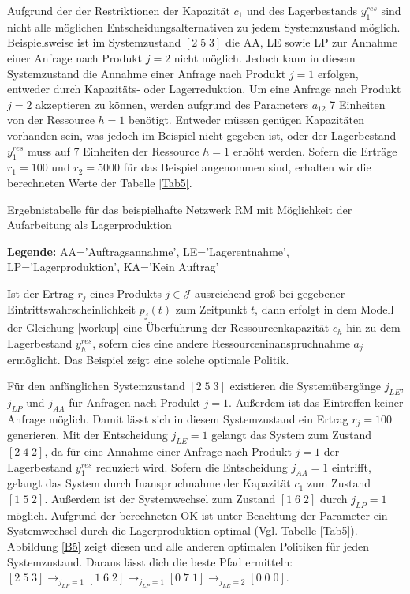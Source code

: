 Aufgrund der der Restriktionen der Kapazität $c_{1}$ und des Lagerbestands $y_{1}^{res}$ sind nicht alle möglichen Entscheidungsalternativen zu jedem Systemzustand möglich. Beispielsweise ist im Systemzustand $[2\;5\;3]$ die AA, LE sowie LP zur Annahme einer Anfrage nach Produkt $j=2$ nicht möglich. Jedoch kann in diesem Systemzustand die Annahme einer Anfrage nach Produkt $j=1$ erfolgen, entweder durch Kapazitäts- oder Lagerreduktion. Um eine Anfrage nach Produkt $j=2$ akzeptieren zu können, werden aufgrund des Parameters $a_{12}$ 7 Einheiten von der Ressource $h=1$ benötigt. Entweder müssen genügen Kapazitäten vorhanden sein, was jedoch im Beispiel nicht gegeben ist, oder der Lagerbestand $y_{1}^{res}$ muss auf 7 Einheiten der Ressource $h=1$ erhöht werden. Sofern die Erträge $r_{1}=100$ und $r_{2}=5000$ für das Beispiel angenommen sind, erhalten wir die berechneten Werte der Tabelle \ref{Tab5}.
\begin{table}
\begin{footnotesize}
    \caption{Ergebnistabelle für das beispielhafte Netzwerk RM mit Möglichkeit der Aufarbeitung als Lagerproduktion} \label{Tab5}
    \vspace*{3mm}
    \begin{center}
      {\footnotesize \textbf{Legende:} AA='Auftragsannahme', LE='Lagerentnahme', LP='Lagerproduktion', KA='Kein Auftrag'} 
      \end{center}
\end{footnotesize}
\end{table}

Ist der Ertrag $r_{j}$ eines Produkts $j\in\mathcal{J}$ ausreichend groß bei gegebener Eintrittswahrscheinlichkeit $p_{j}(t)$ zum Zeitpunkt $t$, dann erfolgt in dem Modell der Gleichung \eqref{workup} eine Überführung der Ressourcenkapazität $c_{h}$ hin zu dem Lagerbestand $y_{h}^{res}$, sofern dies eine andere Ressourceninanspruchnahme $a_{j}$ ermöglicht. Das Beispiel zeigt eine solche optimale Politik.

Für den anfänglichen Systemzustand $[2\;5\;3]$ existieren die Systemübergänge $j_{LE}$, $j_{LP}$ und $j_{AA}$ für Anfragen nach Produkt $j=1$. Außerdem ist das Eintreffen keiner Anfrage möglich. Damit lässt sich in diesem Systemzustand ein Ertrag $r_{j}=100$ generieren. Mit der Entscheidung $j_{LE}=1$ gelangt das System zum Zustand $[2\;4\;2]$, da für eine Annahme einer Anfrage nach Produkt $j=1$ der Lagerbestand $y_{1}^{res}$ reduziert wird. Sofern die Entscheidung $j_{AA}=1$ eintrifft, gelangt das System durch Inanspruchnahme der Kapazität $c_{1}$ zum Zustand $[1\;5\;2]$. Außerdem ist der Systemwechsel zum Zustand $[1\;6\;2]$ durch $j_{LP}=1$ möglich. Aufgrund der berechneten OK ist unter Beachtung der Parameter ein Systemwechsel durch die Lagerproduktion optimal (Vgl. Tabelle \ref{Tab5}). Abbildung \ref{B5} zeigt diesen und alle anderen optimalen Politiken für jeden Systemzustand. Daraus lässt dich die beste Pfad ermitteln:  $[2\;5\;3] \rightarrow_{j_{LP}=1} [1\;6\;2] \rightarrow_{j_{LP}=1} [0\;7\;1] \rightarrow_{j_{LE}=2} [0\;0\;0]$.

